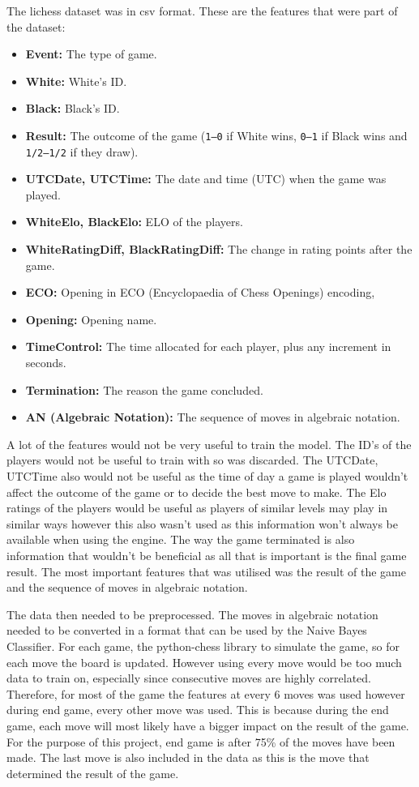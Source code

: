 The lichess dataset was in csv format. These are the features that were part of the dataset:

\begin{itemize}
    \item \textbf{Event:} The type of game.
    \item \textbf{White:} White's ID.
    \item \textbf{Black:} Black's ID.
    \item \textbf{Result:} The outcome of the game (\texttt{1--0} if White wins, \texttt{0--1} if Black wins and \texttt{1/2--1/2} if they draw).
    \item \textbf{UTCDate, UTCTime:} The date and time (UTC) when the game was played.
    \item \textbf{WhiteElo, BlackElo:} ELO of the players.
    \item \textbf{WhiteRatingDiff, BlackRatingDiff:} The change in rating points after the game.
    \item \textbf{ECO:} Opening in ECO (Encyclopaedia of Chess Openings) encoding,
    \item \textbf{Opening:} Opening name.
    \item \textbf{TimeControl:} The time allocated for each player, plus any increment in seconds.
    \item \textbf{Termination:} The reason the game concluded.
    \item \textbf{AN (Algebraic Notation):} The sequence of moves in algebraic notation.
\end{itemize}

A lot of the features would not be very useful to train the model. The ID's of the players would not be useful to train with so was discarded. The UTCDate, UTCTime also would not be useful as the time of day a game is played wouldn't affect the outcome of the game or to decide the best move to make. The Elo ratings of the players would be useful as players of similar levels may play in similar ways however this also wasn't used as this information won't always be available when using the engine. The way the game terminated is also information that wouldn't be beneficial as all that is important is the final game result. The most important features that was utilised was the result of the game and the sequence of moves in algebraic notation.

The data then needed to be preprocessed. The moves in algebraic notation needed to be converted in a format that can be used by the Naive Bayes Classifier. For each game, the python-chess library to simulate the game, so for each move the board is updated. However using every move would be too much data to train on, especially since consecutive moves are highly correlated. Therefore, for most of the game the features at every 6 moves was used however during end game, every other move was used. This is because during the end game, each move will most likely have a bigger impact on the result of the game. For the purpose of this project, end game is after 75\% of the moves have been made. The last move is also included in the data as this is the move that determined the result of the game.
